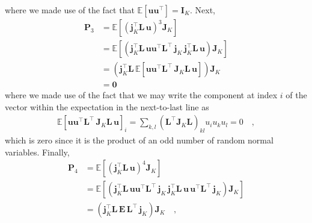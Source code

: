 \documentclass[modern]{aastex62}
\begin{document}
%
where we made use of the fact that $\mathbb{E}\left[ \mathbf{u} \mathbf{u}^\top\right] = \mathbf{I}_K$.
%
Next,
%
\begin{align}
    \mathbf{P}_3 & = \mathbb{E}\left[ \left(\mathbf{j}_K^\top \mathbf{L} \, \mathbf{u}\right)^3 \mathbf{J}_K \right]
    \nonumber                                                                                                                                                                                                       \\
                 & = \mathbb{E}\left[\left(\mathbf{j}_K^\top \mathbf{L} \,  \mathbf{u} \mathbf{u}^\top  \mathbf{L}^\top \, \mathbf{j}_K \, \mathbf{j}_K^\top \mathbf{L} \,  \mathbf{u} \right) \mathbf{J}_K \right]
    \nonumber                                                                                                                                                                                                       \\
                 & = \left(\mathbf{j}_K^\top \mathbf{L} \,  \mathbb{E}\left[\mathbf{u} \mathbf{u}^\top  \mathbf{L}^\top \, \mathbf{J}_K \mathbf{L} \,  \mathbf{u}\right] \right) \mathbf{J}_K
    \nonumber                                                                                                                                                                                                       \\
                 & = \mathbf{0}
\end{align}
%
where we made use of the fact that we may write the component at index $i$ of the vector within the expectation in the next-to-last line
as
\begin{align}
    \mathbb{E}\left[\mathbf{u} \mathbf{u}^\top  \mathbf{L}^\top \, \mathbf{J}_K \mathbf{L} \,  \mathbf{u}\right]_{i} = \sum\limits_{k,l}(\mathbf{L}^\top \mathbf{J}_K \mathbf{L})_{kl} u_i u_k u_l = 0
    \quad,
    \nonumber
\end{align}
%
which is zero since it is the product of an odd number of random normal variables.
Finally,
%
\begin{align}
    \mathbf{P}_4 & = \mathbb{E}\left[ \left(\mathbf{j}_K^\top \mathbf{L} \, \mathbf{u}\right)^4 \mathbf{J}_K \right]
    \nonumber                                                                                                                                                                                                                                                           \\
                 & = \mathbb{E}\left[\left(\mathbf{j}_K^\top \mathbf{L} \,  \mathbf{u} \mathbf{u}^\top  \mathbf{L}^\top \, \mathbf{j}_K \, \mathbf{j}_K^\top \mathbf{L} \,  \mathbf{u} \, \mathbf{u}^\top  \mathbf{L}^\top \, \mathbf{j}_K \right) \mathbf{J}_K \right]
    \nonumber                                                                                                                                                                                                                                                           \\
                 & = \left(\mathbf{j}_K^\top \mathbf{L} \, \mathbf{E} \, \mathbf{L}^\top \, \mathbf{j}_K \right) \mathbf{J}_K
    \quad,
\end{align}
\end{document}
